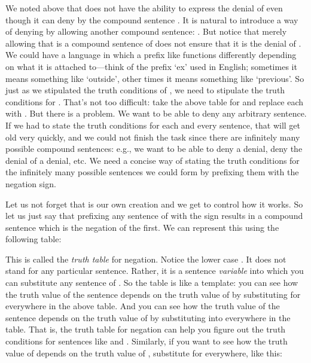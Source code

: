 We noted above that \lL[S]{} does not have the ability to express the denial of 
 even though it can deny  by the compound sentence . It is 
natural to introduce a way of denying  by allowing another compound 
sentence: . But notice that merely allowing that  is a 
compound sentence of \lL[S]{} does not ensure that it is the denial of . We 
could have a language in which a prefix like \p{\lnot} functions differently 
depending on what it is attached to---think of the prefix `ex' used in English; 
sometimes it means something like `outside', other times it means something like 
`previous'.  So just as we stipulated the truth conditions of , we 
need to stipulate the truth conditions for . That's not too difficult: 
take the above table for  and replace each  with . But 
there is a problem.  We want to be able to deny any arbitrary sentence. If we 
had to state the truth conditions for each and every sentence, that will get old 
very quickly, and we could not finish the task since there are infinitely many 
possible compound sentences: e.g., we want to be able to deny a denial, deny the 
denial of a denial, etc. We need a concise way of stating the truth conditions 
for the infinitely many possible sentences we could form by prefixing them with 
the negation sign.

Let us not forget that \lL[S]{} is our own creation and we get to control how it 
works. So let us just say that prefixing any sentence of \lL[S]{} with the 
\p{\lnot} sign results in a compound sentence which is the negation of the 
first.  We can represent this using the following table:

\begin{center}
\end{center}

This is called the \emph{truth table} for negation. Notice the lower case .  
It does not stand for any particular sentence.  Rather, it is a sentence 
\emph{variable} into which you can substitute any sentence of \lL[S]{}. So the 
table is like a template: you can see how the truth value of  the sentence 
 depends on the truth value of  by substituting  for  
everywhere in the above table.  And you can  see how the truth value of the 
sentence  depends on the truth value of  by substituting  
into  everywhere in the table. That is, the truth table for negation  can 
help you figure out the truth conditions for sentences like  and 
.  Similarly, if you want to see how the truth value of  depends on the truth value of , substitute  for  everywhere, like this: 

